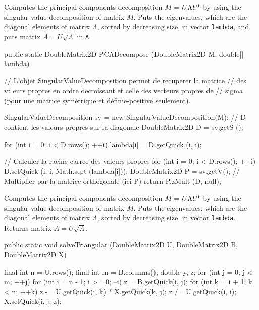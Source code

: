 \begin{tabb} Computes the principal components decomposition $M$ =
 $U\Lambda U^{\mathsf{t}}$ by using the singular value decomposition of matrix
$M$. Puts the eigenvalues, which are the diagonal elements of matrix $\Lambda$,
sorted by decreasing size, in vector \texttt{lambda}, and puts matrix
 $A = U\sqrt{\Lambda}$ in \texttt{A}.
\end{tabb}
\begin{htmlonly}
\end{htmlonly}
\begin{code}

   public static DoubleMatrix2D PCADecompose (DoubleMatrix2D M,
                                              double[] lambda)\begin{hide} {
      // L'objet SingularValueDecomposition permet de recuperer la matrice
      // des valeurs propres en ordre decroissant et celle des vecteurs propres de
      // sigma (pour une matrice symétrique et définie-positive seulement).

      SingularValueDecomposition sv = new SingularValueDecomposition(M);
      // D contient les valeurs propres sur la diagonale
      DoubleMatrix2D D = sv.getS ();

      for (int i = 0; i < D.rows(); ++i)
         lambda[i] = D.getQuick (i, i);

      // Calculer la racine carree des valeurs propres
      for (int i = 0; i < D.rows(); ++i)
         D.setQuick (i, i, Math.sqrt (lambda[i]));
      DoubleMatrix2D P = sv.getV();
      // Multiplier par la matrice orthogonale (ici P)
      return P.zMult (D, null);
   }\end{hide}
\end{code}
\begin{tabb} Computes the principal components decomposition $M$ =
 $U\Lambda U^{\mathsf{t}}$ by using the singular value decomposition of matrix
$M$. Puts the eigenvalues, which are the diagonal elements of matrix $\Lambda$,
sorted by decreasing size, in vector \texttt{lambda}. Returns matrix
 $A = U\sqrt{\Lambda}$.
\end{tabb}
\begin{htmlonly}
\end{htmlonly}
\begin{code}

   public static void solveTriangular (DoubleMatrix2D U, DoubleMatrix2D B,
                                       DoubleMatrix2D X) \begin{hide} {
      final int n = U.rows();
      final int m = B.columns();
      double y, z;
      for (int j = 0; j < m; ++j) {
         for (int i = n - 1; i >= 0; --i) {
            z = B.getQuick(i, j);
            for (int k = i + 1; k < n; ++k)
               z -= U.getQuick(i, k) * X.getQuick(k, j);
            z /= U.getQuick(i, i);
            X.setQuick(i, j, z);
         }
      }
   } \end{hide}
\end{code}
